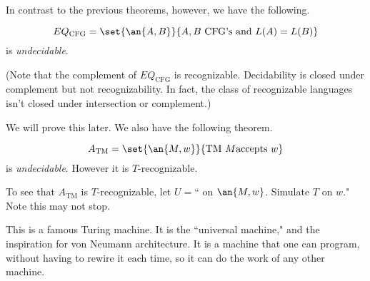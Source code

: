 \vskip0.15in
In contrast to the previous theorems, however, we have the following.
\begin{thm}
\[
EQ_{\text{CFG}}=\set{\an{A,B}}{A,B\text{ CFG's and }L(A)=L(B)}
\]
is {\it undecidable}.
\end{thm}
(Note that the complement of $EQ_{\text{CFG}}$ is recognizable. 
Decidability is closed under complement but not recognizability. In fact, the class of recognizable languages isn't closed under intersection or complement.)

We will prove this later. We also have the following theorem.
\begin{thm}
\[
A_{\text{TM}}=\set{\an{M,w}}{\text{TM }M\text{accepts }w}
\]
is {\it undecidable}. However it is $T$-recognizable.
\end{thm}
To see that $A_{\text{TM}}$ is $T$-recognizable, let $U=$`` on $\an{M,w}$. Simulate $T$ on $w$." Note this may not stop. %

This is a famous Turing machine. It is the ``universal machine," and the inspiration for von Neumann architecture. It is a machine that one can program, without having to rewire it each time, so it can do the work of any other machine.